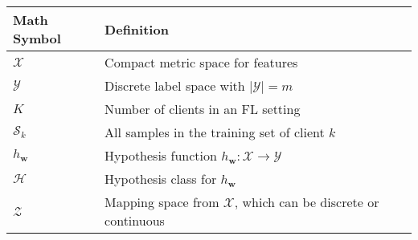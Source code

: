 \begin{tabular}{llll}
\toprule
Math Symbol &             Definition\\
\midrule
$\mathcal{X}$ & Compact metric space for features\\
$\mathcal{Y}$ & Discrete label space  with $|\mathcal{Y}|=m$\\
$K$ & Number of clients in an FL setting\\
$\mathcal{S}_k$ & All samples in the training set of client $k$ \\
$h_{\boldsymbol{w}}$ & Hypothesis function $h_{\boldsymbol{w}}: \mathcal{X}\rightarrow\mathcal{Y}$ \\
$\mathcal{H}$ & Hypothesis class for $h_{\boldsymbol{w}}$ \\
$\mathcal{Z}$ & Mapping space from $\mathcal{X}$, which can be discrete or continuous\\
\bottomrule
\end{tabular}
